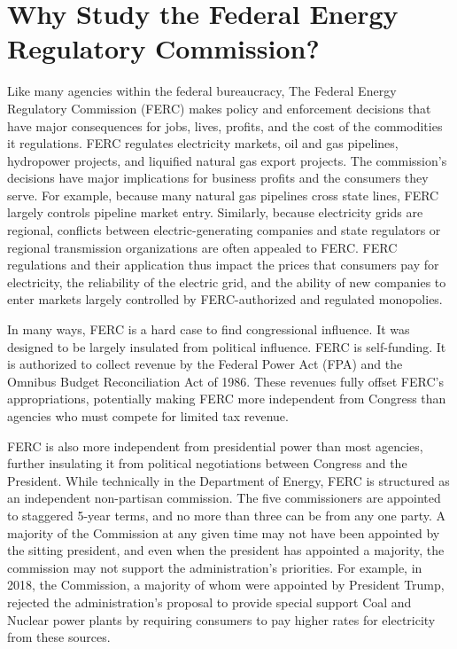 \documentclass{article}
\begin{document}
\section{Why Study the Federal Energy Regulatory Commission?}
Like many agencies within the federal bureaucracy, The Federal Energy Regulatory Commission (FERC) makes policy and enforcement decisions that have major consequences for jobs, lives, profits, and the cost of the commodities it regulations. FERC regulates electricity markets, oil and gas pipelines, hydropower projects, and liquified natural gas export projects. The commission's decisions have major implications for business profits and the consumers they serve. For example, because many natural gas pipelines cross state lines, FERC largely controls pipeline market entry. Similarly, because electricity grids are regional, conflicts between electric-generating companies and state regulators or regional transmission organizations are often appealed to FERC. FERC regulations and their application thus impact the prices that consumers pay for electricity, the reliability of the electric grid, and the ability of new companies to enter markets largely controlled by FERC-authorized and regulated monopolies. 

In many ways, FERC is a hard case to find congressional influence. It was designed to be largely insulated from political influence.  FERC is self-funding. It is authorized to collect revenue by the Federal Power Act (FPA) and the Omnibus Budget Reconciliation Act of 1986. These revenues fully offset FERC's appropriations, potentially making FERC more independent from Congress than agencies who must compete for limited tax revenue.

FERC is also more independent from presidential power than most agencies, further insulating it from political negotiations between Congress and the President. While technically in the Department of Energy, FERC is structured as an independent non-partisan commission. The five commissioners are appointed to staggered 5-year terms, and no more than three can be from any one party. A majority of the Commission at any given time may not have been appointed by the sitting president, and even when the president has appointed a majority, the commission may not support the administration's priorities. For example, in 2018, the Commission, a majority of whom were appointed by President Trump, rejected the administration's proposal to provide special support Coal and Nuclear power plants by requiring consumers to pay higher rates for electricity from these sources.
\end{document}
